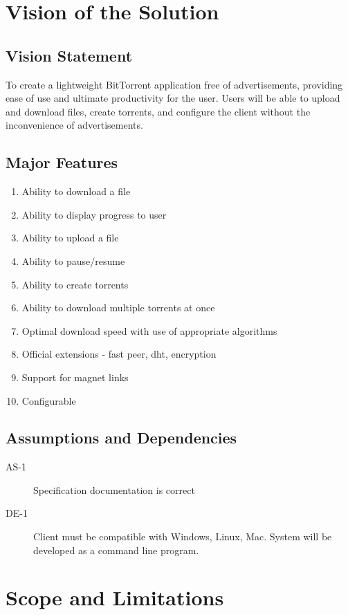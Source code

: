 \documentclass[letter]{scrartcl}
\begin{document}
\section{Vision of the Solution}
\subsection{Vision Statement}
To create a lightweight BitTorrent application free of advertisements, providing ease of use and ultimate productivity for the user.  Users will be able to upload and download files, create torrents, and configure the client without the inconvenience of advertisements.
\subsection{Major Features}
\begin{enumerate}
\item Ability to download a file
\item Ability to display progress to user
\item Ability to upload a file
\item Ability to pause/resume
\item Ability to create torrents
\item Ability to download multiple torrents at once
\item Optimal download speed with use of appropriate algorithms
\item Official extensions - fast peer, dht, encryption
\item Support for magnet links
\item Configurable
\end{enumerate}

\subsection{Assumptions and Dependencies}
\begin{description}
\item[AS-1] Specification documentation is correct
\item[DE-1] Client must be compatible with Windows, Linux, Mac. 
System will be developed as a command line program.
\end{description}

\section{Scope and Limitations}
\end{document}
